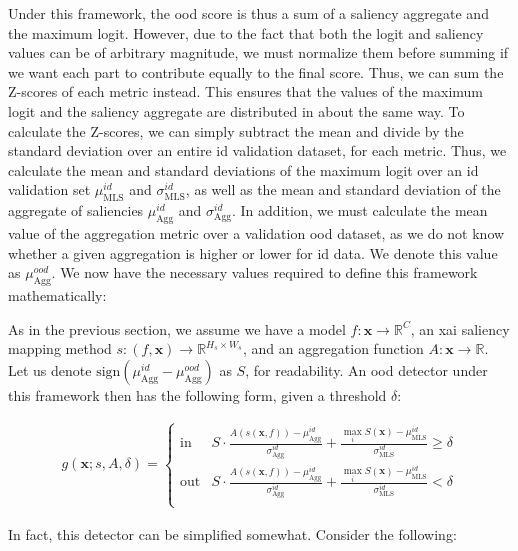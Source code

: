 \documentclass[UKenglish]{uiomasterthesis} %
\newcommand{\R}{\mathbb{R}}
\theoremstyle{definition}
\begin{document}
Under this framework, the \ac{ood} score is thus a sum of a saliency aggregate and the maximum logit. However, due to the fact that both the logit and saliency values can be of arbitrary magnitude, we must normalize them before summing if we want each part to contribute equally to the final score. Thus, we can sum the Z-scores of each metric instead. This ensures that the values of the maximum logit and the saliency aggregate are distributed in about the same way. To calculate the Z-scores, we can simply subtract the mean and divide by the standard deviation over an entire \ac{id} validation dataset, for each metric. Thus, we calculate the mean and standard deviations of the maximum logit over an \ac{id} validation set $\mu_{\text{MLS}}^{id}$ and $\sigma_{\text{MLS}}^{id}$, as well as the mean and standard deviation of the aggregate of saliencies $\mu_{\text{Agg}}^{id}$ and $\sigma_{\text{Agg}}^{id}$. In addition, we must calculate the mean value of the aggregation metric over a validation \ac{ood} dataset, as we do not know whether a given aggregation is higher or lower for \ac{id} data. We denote this value as $\mu_{\text{Agg}}^{ood}$. We now have the necessary values required to define this framework mathematically:

As in the previous section, we assume we have a model $f: \bm{x} \to \R^C$, an \ac{xai} saliency mapping method $s: (f, \bm{x}) \to \R^{H_s \times W_s}$, and an aggregation function $A: \bm{x} \rightarrow \R$. Let us denote $\text{sign}(\mu_{\text{Agg}}^{id} - \mu_{\text{Agg}}^{ood})$ as $S$, for readability. An \ac{ood} detector under this framework then has the following form, given a threshold $\delta$:

{\large
\begin{align}
    g(\bm{x}; s, A, \delta)=\begin{cases} 
    \text{in } &  S \cdot \frac{A(s(\bm{x}, f)) - \mu_{\text{Agg}}^{id}}{\sigma_{\text{Agg}}^{id}} + \frac{\max_i S(\bm{x}) - \mu_{\text{MLS}}^{id}}{\sigma_{\text{MLS}}^{id}} \ge \delta \\[10pt]
    \text{out} &  S \cdot \frac{A(s(\bm{x}, f)) - \mu_{\text{Agg}}^{id}}{\sigma_{\text{Agg}}^{id}} + \frac{\max_i S(\bm{x}) - \mu_{\text{MLS}}^{id}}{\sigma_{\text{MLS}}^{id}} < \delta \\
   \end{cases}
\label{eq:aggregate}
\end{align}
}

In fact, this detector can be simplified somewhat. Consider the following:
\end{document}

